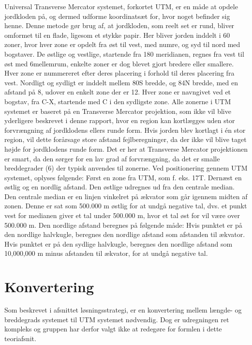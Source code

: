 Universal Transverse Mercator systemet, forkortet UTM, er en måde at opdele jordkloden på, og dermed udforme koordinatsæt for, hvor noget befinder sig henne. Denne metode gør brug af, at jordkloden, som reelt set er rund, bliver omformet til en flade, ligesom et stykke papir. Her bliver jorden inddelt i 60 zoner, hvor hver zone er opdelt fra øst til vest, med numre, og syd til nord med bogstaver. De østlige og vestlige, startende fra 180 meridianen, regnes fra vest til øst med 6\textdegree mellemrum, enkelte zoner er dog blevet gjort bredere eller smallere. Hver zone er nummereret efter deres placering i forhold til deres placering fra vest.\newline
Nordligt og sydligt er inddelt mellem 80\textdegree S bredde, og 84\textdegree N bredde, med en afstand på 8\textdegree, udover en enkelt zone der er 12\textdegree. Hver zone er  navngivet ved et bogstav, fra C-X, startende med C i den sydligste zone.
Alle zonerne i UTM systemet er baseret på en Transverse Mercator projektion, som ikke vil blive yderligere beskrevet i denne rapport, hvor en region kan kortlægges uden stor forvrængning af jordklodens ellers runde form. Hvis jorden blev kortlagt i én stor region, vil dette forårsage store afstand fejlberegninger, da der ikke vil blive taget højde for jordklodens runde form. Det er her at Transverse Mercator projektionen er smart, da den sørger for en lav grad af forvrængning, da det er smalle breddegrader (6\textdegree) der typisk anvendes til zonerne. \newline
Ved positionering gennem UTM systemet, oplyses følgende: Først en zone fra UTM, som f. eks. 17T. Dernæst en østlig og en nordlig afstand. Den østlige udregnes ud fra den centrale median. Den centrale median er en linjen vinkelret på ækvator som går igennem midten af zonen. Denne er sat som 500.000 m østlig for at undgå negative tal, dvs. et punkt vest for medianen giver et tal under 500.000 m, hvor et tal øst for vil være over 500.000 m.  Den nordlige afstand beregnes på følgende måde: Hvis punktet er på den nordlige halvkugle, beregnes den nordlige afstand som afstanden til ækvator. Hvis punktet er på den sydlige halvkugle, beregnes den nordlige afstand som 10,000,000 m minus afstanden til ækvator, for at undgå negative tal. \citep{UTMTeori}

\section{Konvertering}
Som beskrevet i afsnittet løsningsstrategi, er en konvertering mellem længde- og breddegrads systemet til UTM systemet nødvendig. Dog er udregningen ret kompleks og gruppen har derfor valgt ikke at redegøre for formlen i dette teoriafsnit.

